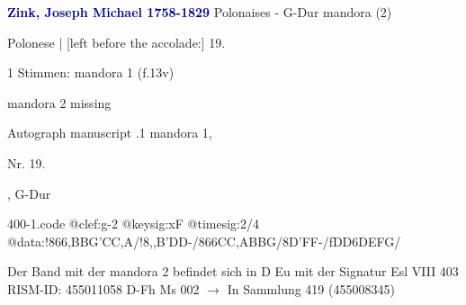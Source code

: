 \documentclass[twocolumn]{book}
\begin{document}
\newline \par \vspace{7pt} \textcolor{darkblue}{\textbf{Zink, Joseph Michael  1758-1829}}
\newline Polonaises - G-Dur
\newline mandora (2)
\newline \begin{itshape}[f.13v, at left:] Polonese | [left before the accolade:] 19.\end{itshape} 
\newline \textcolor{darkblue}{}  1 Stimmen: mandora 1  (f.13v)
\newline \begin{small} mandora 2 missing\end{small} 
\newline Autograph manuscript
.1  mandora 1, \begin{itshape}Nr. 19.\end{itshape}, G-Dur  
\begin{filecontents*}{400-1.code}
@clef:g-2
@keysig:xF
@timesig:2/4
@data:!866{,BBG}{'CC,A}/!8,,B'DD-/866{CC,A}{BBG}/8D'FF-/fDD6DEFG/
\end{filecontents*}
\newline
%
\newline Der Band mit der mandora 2 befindet sich in D Eu mit der Signatur Esl VIII 403
\newline RISM-ID: 455011058
\newline D-Fh  Ms 002
\newline $\rightarrow$ In Sammlung 419 (455008345)
      
\end{document}
